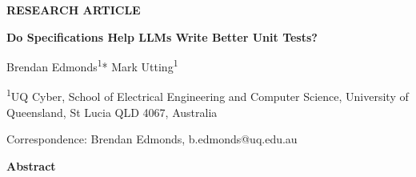\documentclass[11pt]{article}
\begin{document}
\linenumbers

\noindent\textbf{RESEARCH ARTICLE}
\vspace{1em}

\begin{center}
{\LARGE\bfseries Do Specifications Help LLMs Write Better Unit Tests?}
\vspace{1.5em}

{\large Brendan Edmonds\textsuperscript{1}* \quad Mark Utting\textsuperscript{1}}
\vspace{0.5em}

{\small\textsuperscript{1}UQ Cyber, School of Electrical Engineering and Computer Science, University of Queensland, St Lucia QLD 4067, Australia}
\vspace{0.5em}

{\small *Correspondence: Brendan Edmonds, b.edmonds@uq.edu.au}
\end{center}

\vspace{1em}

\noindent\textbf{Abstract}
\vspace{0.5em}
\end{document}
